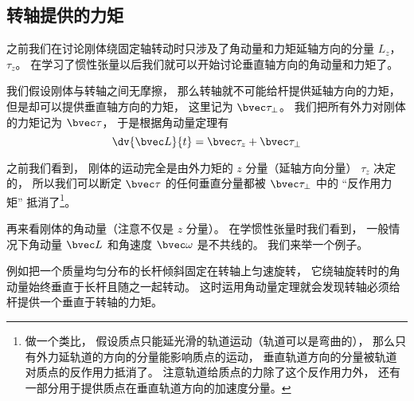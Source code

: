 
\begin{issues}
\issueDraft
\end{issues}


\subsection{转轴提供的力矩}
之前我们在讨论刚体绕固定轴转动时只涉及了角动量和力矩延轴方向的分量 $L_z$， $\tau_z$。 在学习了惯性张量以后我们就可以开始讨论垂直轴方向的角动量和力矩了。


我们假设刚体与转轴之间无摩擦， 那么转轴就不可能给杆提供延轴方向的力矩， 但是却可以提供垂直轴方向的力矩， 这里记为 $\bvec\tau_\bot$。 我们把所有外力对刚体的力矩记为 $\bvec\tau$， 于是根据角动量定理有
\begin{equation}
\dv{\bvec L}{t} = \bvec\tau_z + \bvec\tau_\bot
\end{equation}

之前我们看到， 刚体的运动完全是由外力矩的 $z$ 分量（延轴方向分量） $\tau_z$ 决定的， 所以我们可以断定 $\bvec\tau$ 的任何垂直分量都被 $\bvec\tau_\bot$ 中的 “反作用力矩” 抵消了\footnote{做一个类比， 假设质点只能延光滑的轨道运动（轨道可以是弯曲的）， 那么只有外力延轨道的方向的分量能影响质点的运动， 垂直轨道方向的分量被轨道对质点的反作用力抵消了。 注意轨道给质点的力除了这个反作用力外， 还有一部分用于提供质点在垂直轨道方向的加速度分量。}。

再来看刚体的角动量（注意不仅是 $z$ 分量）。 在学惯性张量时我们看到， 一般情况下角动量 $\bvec L$ 和角速度 $\bvec \omega$ 是不共线的。 我们来举一个例子。


\begin{example}{}\label{RBrot2_ex1}
例如把一个质量均匀分布的长杆倾斜固定在转轴上匀速旋转，%
它绕轴旋转时的角动量始终垂直于长杆且随之一起转动。 这时运用角动量定理就会发现转轴必须给杆提供一个垂直于转轴的力矩。
\end{example}